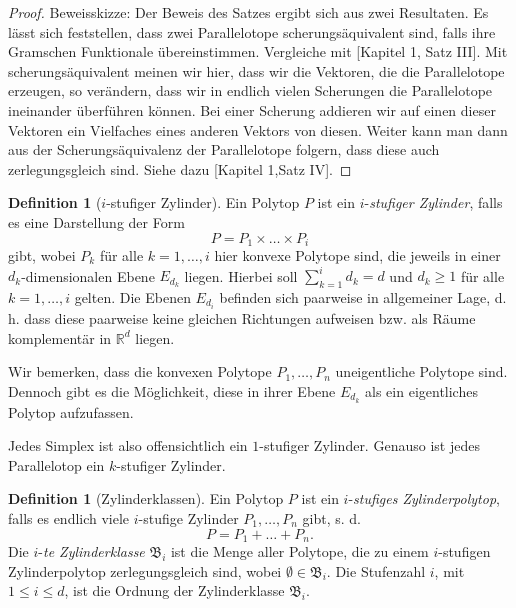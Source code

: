 \documentclass[11pt,titlepage]{article}
\newcommand{\setR}{\mathbb{R}}
\theoremstyle{definition}
\newtheorem{definition}[theorem]{Definition}
\theoremstyle{remark}
\begin{document}
	\begin{proof}
		Beweisskizze: Der Beweis des Satzes ergibt sich aus zwei 
		Resultaten. Es lässt sich feststellen, dass zwei Parallelotope 
		scherungsäquivalent sind, falls ihre Gramschen Funktionale übereinstimmen. 
		Vergleiche mit \cite{Hadwiger}[Kapitel 1, Satz III].
		Mit scherungsäquivalent meinen wir hier, dass wir die 
		Vektoren, die die Parallelotope erzeugen, so verändern, dass wir 
		in endlich vielen Scherungen die Parallelotope ineinander 
		überführen können. Bei einer Scherung addieren wir auf einen 
		dieser Vektoren ein Vielfaches eines anderen Vektors von diesen.
		Weiter kann man dann aus der Scherungsäquivalenz der Parallelotope folgern, 
		dass diese auch zerlegungsgleich sind. Siehe dazu 
		\cite{Hadwiger}[Kapitel 1,Satz IV].
	\end{proof}
	
	\begin{definition}[$i$-stufiger Zylinder]
		Ein Polytop $P$ ist ein $i$-\textsl{stufiger Zylinder}, falls es eine Darstellung 
		der Form
		\[P=P_1 \times\ldots\times P_i\]
		gibt, wobei $P_k$ für alle $k=1,\ldots,i$ hier konvexe Polytope sind, die jeweils in einer $d_k$-dimensionalen Ebene $E_{d_k}$ liegen. Hierbei soll $\sum_{k=1}^i d_k =d$ und $d_k\geq 1$ für alle $k=1,\ldots,i$ 
		gelten. Die Ebenen $E_{d_i}$ befinden sich paarweise in allgemeiner Lage, d. h. dass diese paarweise keine gleichen Richtungen aufweisen 
		bzw. als Räume komplementär in $\setR^d$ liegen.
	\end{definition}
	
	Wir bemerken, dass die konvexen Polytope $P_1,\ldots,P_n$ uneigentliche 
	Polytope sind. Dennoch gibt es die Möglichkeit, diese in ihrer Ebene 
	$E_{d_k}$ als ein eigentliches Polytop aufzufassen.
	
	Jedes Simplex ist also offensichtlich ein $1$-stufiger Zylinder. Genauso 
	ist jedes Parallelotop ein $k$-stufiger Zylinder. 
	
	\begin{definition}[Zylinderklassen]
		Ein Polytop $P$ ist ein $i$-\textsl{stufiges Zylinderpolytop}, falls 
		es endlich viele $i$-stufige Zylinder $P_1,\ldots,P_n$ gibt, s. d.
		\[P=P_1+\ldots+P_n.\]
		Die $i$-\textsl{te Zylinderklasse} $\mathfrak{B}_i$ ist die Menge aller 
		Polytope, die zu einem $i$-stufigen Zylinderpolytop zerlegungsgleich 
		sind, wobei $\emptyset\in\mathfrak{B}_i$. 
		Die Stufenzahl $i$, mit $1\leq i\leq  d$, ist die Ordnung 
		der Zylinderklasse $\mathfrak{B}_i$.
	\end{definition}
	
\end{document}
